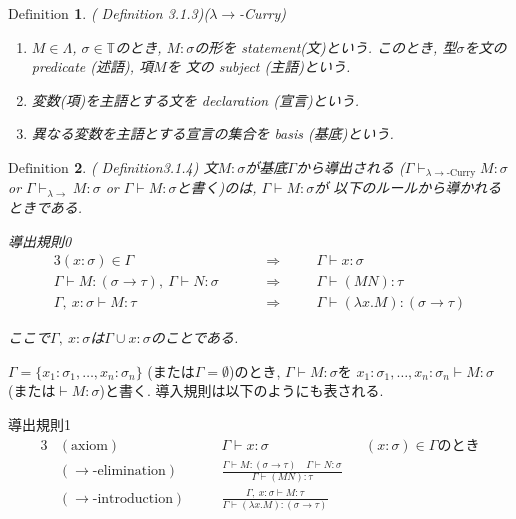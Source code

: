 \documentclass[11pt]{jsreport}
\theoremstyle{mystyle}
\newtheorem{df}{$\textrm{Definition}$}[section]
\newcommand{\T}{\mathbb{T}}
\newcommand{\lama}{\lambda \! \! \to}
\newcommand{\0}{\textbf{0}}
\begin{document}
\begin{shadebox}
  \begin{df}{(\cite{Bar} Definition 3.1.3)}($\lama$-Curry)
    \begin{enumerate}
      \item $M \in \Lambda$, $\sigma \in \T$のとき, $M \colon \sigma$の形を
        statement(文)という. このとき, 型$\sigma$を文の predicate (述語), 項$M$を
        文の subject (主語)という. 
      \item 変数(項)を主語とする文を declaration (宣言)という.
      \item 異なる変数を主語とする宣言の集合を basis (基底)という.
    \end{enumerate}
  \end{df}
\end{shadebox}
\begin{shadebox}
  \begin{df}{(\cite{Bar} Definition3.1.4)}
    文$M \colon \sigma$が基底$\Gamma$から導出される
    ($\Gamma \vdash_{\lama\text{-Curry}} M \colon \sigma$ or 
    $\Gamma \vdash_{\lama} M \colon \sigma$ or 
    $\Gamma \vdash M \colon \sigma$と書く)のは, $\Gamma \vdash M \colon \sigma$が
    以下のルールから導かれるときである. 
    \begin{itembox}[c]{導出規則0}
      \begin{alignat*}{3}
  (x \colon \sigma) \in \Gamma &\quad& &\Rightarrow& \quad
    &\Gamma \vdash x \colon \sigma \\
  \Gamma \vdash M \colon (\sigma \to \tau),\ \Gamma \vdash N \colon \sigma &&
    &\Rightarrow& &\Gamma \vdash (MN) \colon \tau \\
  \Gamma,\ x \colon \sigma \vdash M \colon \tau && &\Rightarrow& 
    &\Gamma \vdash (\lambda x . M) \colon (\sigma \to \tau) 
      \end{alignat*}
    \end{itembox}
    ここで$\Gamma ,\ x \colon \sigma$は$\Gamma \cup x \colon \sigma$のことである.
  \end{df}
\end{shadebox}
$\Gamma = \{ x_1 \colon \sigma_1 , \ldots , x_n \colon \sigma_n\}$
(または$\Gamma = \emptyset$)のとき, $\Gamma \vdash M \colon \sigma$を
$x_1 \colon \sigma_1 , \ldots , x_n \colon \sigma_n \vdash M \colon \sigma$
(または$\vdash M \colon \sigma$)と書く. 
導入規則は以下のようにも表される.
\begin{itembox}[c]{導出規則1}
  \begin{alignat*}{3}
    &(\text{axiom})& \quad &\Gamma \vdash x \colon \sigma& 
      &(x \colon \sigma) \in \Gamma \text{のとき}\\
    &(\text{$\to$-elimination})& 
      &\frac{\Gamma \vdash M \colon (\sigma \to \tau) \quad
        \Gamma \vdash N \colon \sigma}{\Gamma \vdash (MN) \colon \tau}& & \\
    &(\text{$\to$-introduction})& &\frac{\Gamma,\ x \colon \sigma \vdash M \colon \tau}
      {\Gamma \vdash (\lambda x . M) \colon (\sigma \to \tau)}& &
  \end{alignat*}
\end{itembox}
\end{document}
